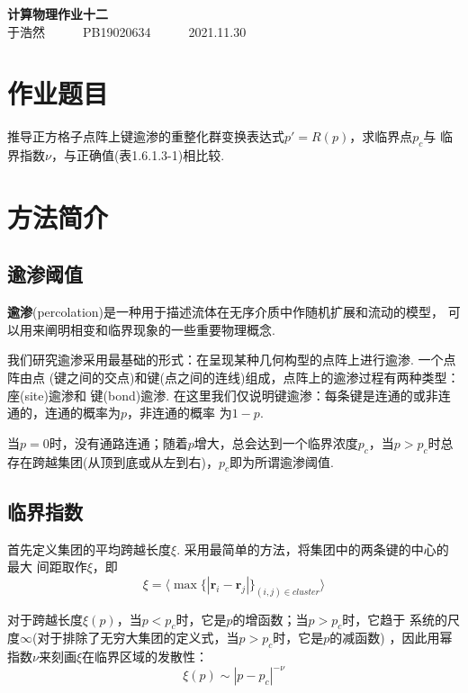 \documentclass[12pt,a4paper,utf8]{ctexart}
\begin{document}
\begin{center}
    {\LARGE\textbf{计算物理作业十二}}\\
    \textrm{于浩然}~~~~~~\textrm{PB19020634}~~~~~~\textrm{2021.11.30}
\end{center}

\section{作业题目}

推导正方格子点阵上键逾渗的重整化群变换表达式$p' = R(p)$，求临界点$p_c$与
临界指数$\nu$，与正确值(表1.6.1.3-1)相比较.
\section{方法简介}
\subsection{逾渗阈值}

\textbf{逾渗}(percolation)是一种用于描述流体在无序介质中作随机扩展和流动的模型，
可以用来阐明相变和临界现象的一些重要物理概念. 

我们研究逾渗采用最基础的形式：在呈现某种几何构型的点阵上进行逾渗. 一个点阵由点
(键之间的交点)和键(点之间的连线)组成，点阵上的逾渗过程有两种类型：座(site)逾渗和
键(bond)逾渗. 
在这里我们仅说明键逾渗：每条键是连通的或非连通的，连通的概率为$p$，非连通的概率
为$1-p$. 

当$p=0$时，没有通路连通；随着$p$增大，总会达到一个临界浓度$p_c$，当$p > p_c$时总
存在跨越集团(从顶到底或从左到右)，$p_c$即为所谓逾渗阈值. 

\subsection{临界指数}

首先定义集团的平均跨越长度$\xi$. 采用最简单的方法，将集团中的两条键的中心的最大
间距取作$\xi$，即
\begin{equation}
    \xi = \langle \max \{ | \mathbf{r}_i - \mathbf{r}_j|\}_{(i,j) \in cluster} \rangle 
\end{equation}

对于跨越长度$\xi(p)$，当$p < p_c$时，它是$p$的增函数；当$p > p_c$时，它趋于
系统的尺度$\infty$(对于排除了无穷大集团的定义式，当$p > p_c$时，它是$p$的减函数)
，因此用幂指数$\nu$来刻画$\xi$在临界区域的发散性：
\begin{equation}
    \xi(p)\sim |p-p_c|^{-\nu}
\end{equation}
\end{document}
